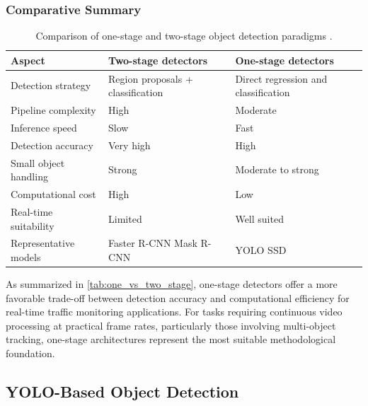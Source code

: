 \subsubsection{Comparative Summary}

\begin{table}[H]
\centering
\caption[Comparison of two-stage and one-stage object detection paradigms]{Comparison of one-stage and two-stage object detection paradigms \citep{Ma2024}.}
\begin{tabular}{p{3.5cm} p{5cm} p{5cm}}
\\
\textbf{Aspect} & \textbf{Two-stage detectors} & \textbf{One-stage detectors} \\
\toprule
Detection strategy & Region proposals + \newline classification & Direct regression and \newline classification \\
\midrule
Pipeline \newline complexity & High & Moderate \\
\midrule
Inference speed \newline  & Slow & Fast \\
\midrule
Detection accuracy \newline & Very high & High \\
\midrule
Small object \newline handling & Strong & Moderate to strong \\
\midrule
Computational cost & High & Low \\
\midrule
Real-time \newline suitability & Limited & Well suited \\
\midrule
Representative models & Faster R-CNN \newline Mask R-CNN & YOLO \newline SSD \\
\bottomrule
\end{tabular}
\label{tab:one_vs_two_stage}
\end{table}

As summarized in \autoref{tab:one_vs_two_stage}, one-stage detectors offer a more favorable trade-off between detection accuracy and computational efficiency for real-time traffic monitoring applications. For tasks requiring continuous video processing at practical frame rates, particularly those involving multi-object tracking, one-stage architectures represent the most suitable methodological foundation.

\subsection{YOLO-Based Object Detection}
\label{sec:yolo_models}

